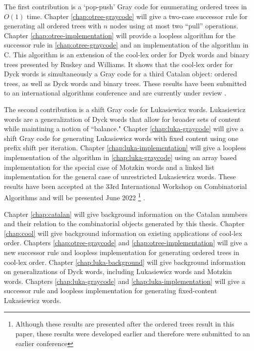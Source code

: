 The first contribution is a `pop-push' Gray code for enumerating ordered trees in $O(1)$ time. Chapter \ref{chap:otree-graycode} will give a two-case successor rule for generating all ordered trees with $n$ nodes using at most two ``pull'' operations. Chapter \ref{chap:otree-implementation} will provide a loopless algorithm for the successor rule in \ref{chap:otree-graycode} and an implementation of the algorithm in C.  This algorithm is an extension of the cool-lex order for Dyck words and binary trees presented by Ruskey and Williams. It shows that the cool-lex order for Dyck words is simultaneously a Gray code for a third Catalan object: ordered trees, as well as Dyck words and binary trees.  These results have been submitted to an international algorithms conference and are currently under review \cite{lapeypush}.

The second contribution is a shift Gray code for Lukasiewicz words.  Lukasiewicz words are a generalization of Dyck words that allow for broader sets of content while maintining a notion of ``balance." Chapter \ref{chap:luka-graycode} will give a shift Gray code for generating Lukasiewicz words with fixed content using one prefix shift per iteration.  Chapter \ref{chap:luka-implementation} will give a loopless implementation of the algorithm in \ref{chap:luka-graycode} using an array based implementation for the special case of Motzkin words and a linked list implementation for the general case of unrestricted Lukasiewicz words.  These results have been accepted at the 33rd International Workshop on Combinatorial Algorithms and will be presented June 2022 \footnote{Although these results are presented after the ordered trees result in this paper, these results were developed earlier and therefore were submitted to an earlier conference} \cite{lapey2022shift}.

Chapter \ref{chap:catalan} will give background information on the Catalan numbers and their relation to the combinatorial objects generated by this thesis.  Chapter \ref{chap:cool} will give background information on existing applications of cool-lex order.  Chapters \ref{chap:otree-graycode} and \ref{chap:otree-implementation} will give a new successor rule and loopless implementation for generating ordered trees in cool-lex order.  Chapter \ref{chap:luka-background} will give background information on generalizations of Dyck words, including Lukasiewicz words and Motzkin words. Chapters \ref{chap:luka-graycode} and \ref{chap:luka-implementation} will give a successor rule and loopless implementation for generating fixed-content Lukasiewicz words.
